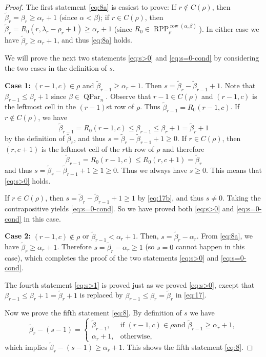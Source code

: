 \documentclass[12pt]{amsart}
\numberwithin{equation}{section}
\theoremstyle{definition}
\newcommand\wb{\widetilde{\beta}}
\newcommand\row{\operatorname{row}}
\newcommand\QPar{\operatorname{QPar}}
\newcommand\RPP{\operatorname{RPP}}
\begin{document}
\begin{proof}
  The first statement \eqref{eq:8a} is easiest to prove:
  If $r\notin C(\rho)$, then $\wb_r=\beta_r\ge\alpha_r+1$
  (since $\alpha < \beta$);
  if $r\in C(\rho)$, then $\wb_r=R_0(r,\lambda_r-\rho_r+1)\ge\alpha_r+1$
  (since $R_0 \in \RPP^{\row(\alpha,\beta)}_{\rho}$).
  In either case we have $\wb_r\ge \alpha_r+1$,
  and thus \eqref{eq:8a} holds.

  We will prove the next two statements \eqref{eq:s>0} and \eqref{eq:s=0-cond}
  by considering the two cases in the definition of $s$.

  \textbf{Case 1:}
  $(r-1,c)\in\rho$ and $\wb_{r-1}\ge\alpha_r+1$. Then
  $s=\wb_r-\wb_{r-1}+1$. Note that $\beta_{r-1} \le \beta_r+1$
  since $\beta \in \QPar_n$.
  Observe that $r-1\in C(\rho)$ and $(r-1,c)$ is the
  leftmost cell in the $(r-1)$st row of $\rho$. Thus $\wb_{r-1}=R_0(r-1,c)$. If
  $r\notin C(\rho)$, we have
  \begin{equation}
    \label{eq:17}
  \wb_{r-1}=R_0(r-1,c) \le \beta_{r-1} \le \beta_r+1 = \wb_r+1
  \end{equation}
  by the definition of $\wb_r$, and thus
  $s=\wb_r-\wb_{r-1}+1\ge0$.
  If $r\in C(\rho)$, then $(r,c+1)$ is the leftmost cell of the $r$th row of
  $\rho$ and therefore
  \begin{equation}
    \label{eq:17b}
  \wb_{r-1}=R_0(r-1,c)  \le R_0(r,c+1) = \wb_r
  \end{equation}
  and thus $s=\wb_r-\wb_{r-1}+1\ge1\ge 0$.
Thus we always have $s\ge 0$.
This means that \eqref{eq:s>0} holds.

If $r \in C(\rho)$, then $s=\wb_r-\wb_{r-1}+1 \ge 1$ by \eqref{eq:17b},
and thus $s \neq 0$. Taking the contrapositive yields \eqref{eq:s=0-cond}.
So we have proved both \eqref{eq:s>0} and \eqref{eq:s=0-cond} in this case.

\textbf{Case 2:}
$(r-1,c)\notin\rho$ or $\wb_{r-1}<\alpha_r+1$.
Then, $s=\wb_r-\alpha_r$. From \eqref{eq:8a},
we have $\wb_r \ge \alpha_r + 1$.
Therefore $s=\wb_r-\alpha_r \ge 1$ (so $s=0$ cannot happen in this case),
which completes the proof of the
two statements \eqref{eq:s>0} and \eqref{eq:s=0-cond}.

The fourth statement \eqref{eq:s>1} is proved just as we proved
\eqref{eq:s>0}, except that $\beta_{r-1} \le \beta_r+1 = \wb_r+1$
is replaced by $\beta_{r-1} \leq \beta_r = \wb_r$ in \eqref{eq:17}.

Now we prove the fifth statement \eqref{eq:8}. By definition of $s$ we have
\begin{equation}
  \label{eq:13}
\wb_r-(s-1) = \begin{cases}
  \wb_{r-1}, & \mbox{if $(r-1,c)\in\rho$
  and $\wb_{r-1}\ge\alpha_r+1$} ,\\
\alpha_r+1, &\mbox{otherwise},
\end{cases}
\end{equation}
which implies $\wb_r-(s-1)\ge\alpha_r+1$. This shows the fifth statement
\eqref{eq:8}.
  

\end{proof}
\end{document}
